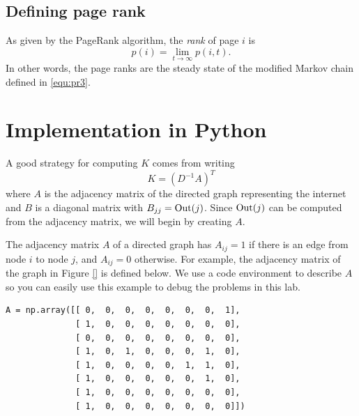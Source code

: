 \subsection*{Defining page rank}
As given by the PageRank algorithm, the \emph{rank} of page $i$ is
\[p(i) = \lim_{t\to \infty} p(i,t).\]
In other words, the page ranks are the steady state of the modified Markov chain defined in \eqref{equ:pr3}.



\section*{Implementation in Python}
A good strategy for computing $K$ comes from writing
\[
K = (D^{-1}A)^T
\]
where $A$ is the adjacency matrix of the directed graph representing the internet and $B$ is a diagonal matrix with $B_{jj}=\operatorname{Out}(j)$.
Since $\operatorname{Out}(j)$ can be computed from the adjacency matrix, we will begin by creating $A$.

The adjacency matrix $A$ of a directed graph has $A_{ij}=1$ if there is an edge from node $i$ to node $j$, and $A_{ij}=0$ otherwise.
For example, the adjacency matrix of the graph in Figure \ref{} is defined below.
We use a code environment to describe $A$ so you can easily use this example to debug the problems in this lab.
\begin{lstlisting}
A = np.array([[ 0,  0,  0,  0,  0,  0,  0,  1],
              [ 1,  0,  0,  0,  0,  0,  0,  0],
              [ 0,  0,  0,  0,  0,  0,  0,  0],
              [ 1,  0,  1,  0,  0,  0,  1,  0],
              [ 1,  0,  0,  0,  0,  1,  1,  0],
              [ 1,  0,  0,  0,  0,  0,  1,  0],
              [ 1,  0,  0,  0,  0,  0,  0,  0],
              [ 1,  0,  0,  0,  0,  0,  0,  0]])
\end{lstlisting}



